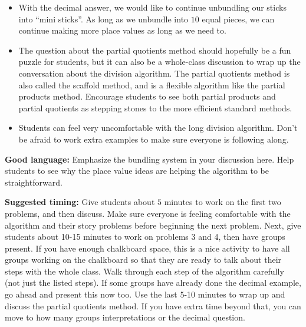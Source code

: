 \documentclass[nooutcomes,noauthor]{ximera}
\begin{document}
\begin{instructorNotes}
\begin{itemize}
	\item With the decimal answer, we would like to continue unbundling our sticks into ``mini sticks''. As long as we unbundle into $10$ equal pieces, we can continue making more place values as long as we need to.
	\item The question about the partial quotients method should hopefully be a fun puzzle for students, but it can also be a whole-class discussion to wrap up the conversation about the division algorithm. The partial quotients method is also called the scaffold method, and is a flexible algorithm like the partial products method. Encourage students to see both partial products and partial quotients as stepping stones to the more efficient standard methods.
	\item Students can feel very uncomfortable with the long division algorithm. Don't be afraid to work extra examples to make sure everyone is following along.
\end{itemize}


{\bf Good language:} Emphasize the bundling system in your discussion here. Help students to see why the place value ideas are helping the algorithm to be straightforward. 

{\bf Suggested timing:} Give students about $5$ minutes to work on the first two problems, and then discuss. Make sure everyone is feeling comfortable with the algorithm and their story problems before beginning the next problem. Next, give students about 10-15 minutes to work on problems 3 and 4, then have groups present. If you have enough chalkboard space, this is a nice activity to have all groups working on the chalkboard so that they are ready to talk about their steps with the whole class. Walk through each step of the algorithm carefully (not just the listed steps). If some groups have already done the decimal example, go ahead and present this now too. Use the last 5-10 minutes to wrap up and discuss the partial quotients method. If you have extra time beyond that, you can move to how many groups interpretations or the decimal question.




\end{instructorNotes}
\end{document}
